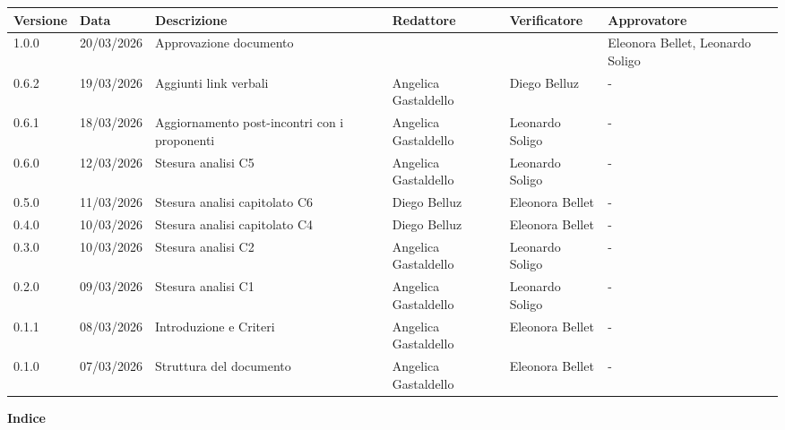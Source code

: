 \documentclass[a4paper,12pt]{article}
\begin{document}
\renewcommand{\arraystretch}{1.35}
\begin{center}
    {\footnotesize
    \begin{tabularx}{\textwidth}{|p{1.4cm}|p{1.8cm}|X|p{2.4cm}|p{2.3cm}|p{2.3cm}|}
        \hline
        \rowcolor{gray!20}
        \textbf{Versione} & \textbf{Data} & \textbf{Descrizione} & \textbf{Redattore} & \textbf{Verificatore} & \textbf{Approvatore} \\
        \hline
        1.0.0 & 20/03/2026 & Approvazione documento &  &  & Eleonora Bellet, Leonardo Soligo \\
        \hline
        0.6.2 & 19/03/2026 & Aggiunti link verbali & Angelica Gastaldello & Diego Belluz & - \\
        \hline
        0.6.1 & 18/03/2026 & Aggiornamento post-incontri con i proponenti & Angelica Gastaldello & Leonardo Soligo & - \\
        \hline
        0.6.0 & 12/03/2026 & Stesura analisi C5 & Angelica Gastaldello & Leonardo Soligo & - \\
        \hline
        0.5.0 & 11/03/2026 & Stesura analisi capitolato C6 & Diego Belluz & Eleonora Bellet & - \\
        \hline
        0.4.0 & 10/03/2026 & Stesura analisi capitolato C4 & Diego Belluz & Eleonora Bellet & - \\
        \hline
        0.3.0 & 10/03/2026 & Stesura analisi C2 & Angelica Gastaldello & Leonardo Soligo & - \\
        \hline
        0.2.0 & 09/03/2026 & Stesura analisi C1 & Angelica Gastaldello & Leonardo Soligo & - \\
        \hline
        0.1.1 & 08/03/2026 & Introduzione e Criteri & Angelica Gastaldello & Eleonora Bellet & - \\
        \hline
        0.1.0 & 07/03/2026 & Struttura del documento & Angelica Gastaldello & Eleonora Bellet & - \\
        \hline
    \end{tabularx}
    }
\end{center}
\newpage

\begin{center} 
    {\Large \textbf{Indice}}
\end{center}

\vspace{0.6cm}

\tableofcontents

\newpage

\setcounter{page}{4}
\end{document}
